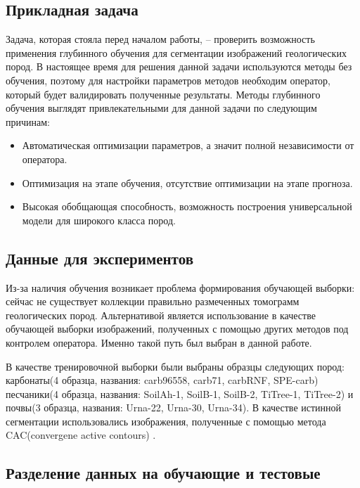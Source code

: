 \documentclass[12pt, a4paper]{extarticle}
\begin{document}
\subsection{Прикладная задача}

Задача, которая стояла перед началом работы, -- проверить возможность применения глубинного обучения для сегментации изображений геологических пород. В настоящее время для решения данной задачи используются методы без обучения, поэтому для настройки параметров методов необходим оператор, который будет валидировать полученные результаты.
Методы глубинного обучения выглядят привлекательными для данной задачи по следующим причинам:
\begin{itemize}
	\item Автоматическая оптимизации параметров, а значит полной 	независимости от оператора.
	
	\item Оптимизация на этапе обучения, отсутствие оптимизации на этапе прогноза.
	
	\item Высокая обобщающая способность, возможность построения универсальной модели для широкого класса пород.
	
\end{itemize}
 
\subsection{Данные для экспериментов}

Из-за наличия обучения возникает проблема формирования обучающей выборки: сейчас не существует коллекции правильно размеченных томограмм геологических пород. Альтернативой является использование в качестве обучающей выборки изображений, полученных с помощью других методов под контролем оператора. Именно такой путь был выбран в данной работе.

В качестве тренировочной выборки были выбраны образцы следующих пород: карбонаты(4 образца, названия: carb96558, carb71, carbRNF, SPE-carb)  песчаники(4 образца, названия: SoilAh-1, SoilB-1, SoilB-2, TiTree-1, TiTree-2) и почвы(3 образца, названия: Urna-22, Urna-30, Urna-34). В	качестве истинной сегментации использовались изображения, полученные с помощью метода CAC(convergene active contours) \cite{12}.


\subsection{Разделение данных на обучающие и тестовые}
\end{document}

